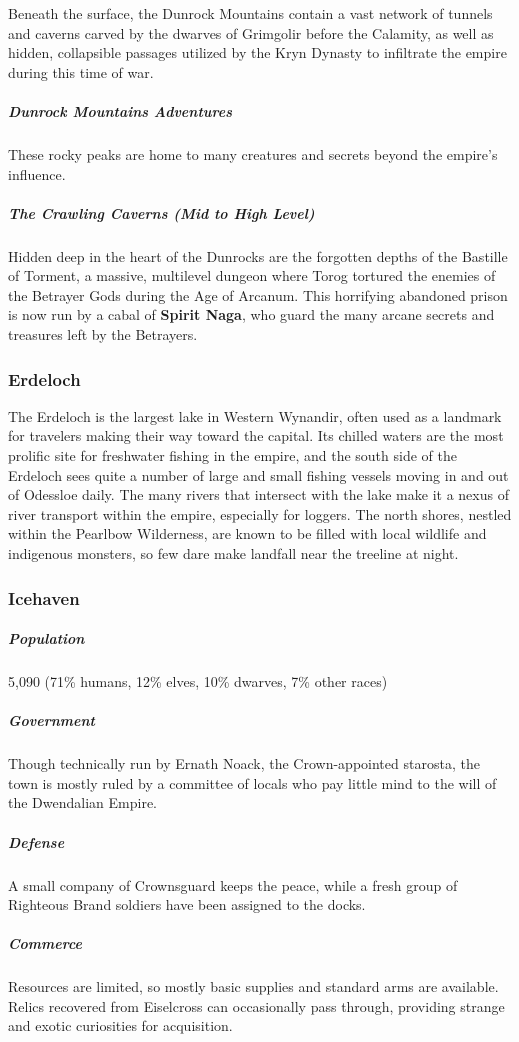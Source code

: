 \documentclass[10pt,a4paper,twoside,bg=print,twocolumn,openany,nodeprecatedcode]{dndbook}
\begin{document}
Beneath the surface, the Dunrock Mountains contain a vast network of tunnels and caverns carved by the dwarves of Grimgolir before the Calamity, as well as hidden, collapsible passages utilized by the Kryn Dynasty to infiltrate the empire during this time of war.

\subparagraph{Dunrock Mountains Adventures}
These rocky peaks are home to many creatures and secrets beyond the empire's influence.

\subparagraph{The Crawling Caverns (Mid to High Level)}
Hidden deep in the heart of the Dunrocks are the forgotten depths of the Bastille of Torment, a massive, multilevel dungeon where Torog tortured the enemies of the Betrayer Gods during the Age of Arcanum. This horrifying abandoned prison is now run by a cabal of \textbf{Spirit Naga}, who guard the many arcane secrets and treasures left by the Betrayers.

\subsubsection{Erdeloch}
The Erdeloch is the largest lake in Western Wynandir, often used as a landmark for travelers making their way toward the capital. Its chilled waters are the most prolific site for freshwater fishing in the empire, and the south side of the Erdeloch sees quite a number of large and small fishing vessels moving in and out of Odessloe daily. The many rivers that intersect with the lake make it a nexus of river transport within the empire, especially for loggers. The north shores, nestled within the Pearlbow Wilderness, are known to be filled with local wildlife and indigenous monsters, so few dare make landfall near the treeline at night.

\subsubsection{Icehaven}
\subparagraph{Population}
5,090 (71\% humans, 12\% elves, 10\% dwarves, 7\% other races)

\subparagraph{Government}
Though technically run by Ernath Noack, the Crown-appointed starosta, the town is mostly ruled by a committee of locals who pay little mind to the will of the Dwendalian Empire.

\subparagraph{Defense}
A small company of Crownsguard keeps the peace, while a fresh group of Righteous Brand soldiers have been assigned to the docks.

\subparagraph{Commerce}
Resources are limited, so mostly basic supplies and standard arms are available. Relics recovered from Eiselcross can occasionally pass through, providing strange and exotic curiosities for acquisition.
\end{document}
